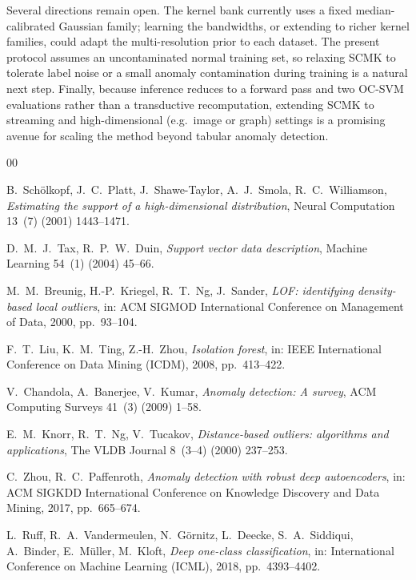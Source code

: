 \documentclass[times, review, 10pt]{elsarticle}
\begin{document}
Several directions remain open. The kernel bank currently uses a fixed
median-calibrated Gaussian family; learning the bandwidths, or extending to richer
kernel families, could adapt the multi-resolution prior to each dataset. The
present protocol assumes an uncontaminated normal training set, so relaxing SCMK to
tolerate label noise or a small anomaly contamination during training is a natural
next step. Finally, because inference reduces to a forward pass and two OC-SVM
evaluations rather than a transductive recomputation, extending SCMK to streaming
and high-dimensional (e.g.\ image or graph) settings is a promising avenue for
scaling the method beyond tabular anomaly detection.

\begin{thebibliography}{00}

B.~Sch\"olkopf, J.~C.~Platt, J.~Shawe-Taylor, A.~J.~Smola, R.~C.~Williamson,
\textit{Estimating the support of a high-dimensional distribution},
Neural Computation 13~(7) (2001) 1443--1471.

D.~M.~J.~Tax, R.~P.~W.~Duin,
\textit{Support vector data description},
Machine Learning 54~(1) (2004) 45--66.

M.~M.~Breunig, H.-P.~Kriegel, R.~T.~Ng, J.~Sander,
\textit{LOF: identifying density-based local outliers},
in: ACM SIGMOD International Conference on Management of Data, 2000,
pp.\ 93--104.

F.~T.~Liu, K.~M.~Ting, Z.-H.~Zhou,
\textit{Isolation forest},
in: IEEE International Conference on Data Mining (ICDM), 2008, pp.\ 413--422.

V.~Chandola, A.~Banerjee, V.~Kumar,
\textit{Anomaly detection: A survey},
ACM Computing Surveys 41~(3) (2009) 1--58.

E.~M.~Knorr, R.~T.~Ng, V.~Tucakov,
\textit{Distance-based outliers: algorithms and applications},
The VLDB Journal 8~(3--4) (2000) 237--253.

C.~Zhou, R.~C.~Paffenroth,
\textit{Anomaly detection with robust deep autoencoders},
in: ACM SIGKDD International Conference on Knowledge Discovery and Data Mining,
2017, pp.\ 665--674.

L.~Ruff, R.~A.~Vandermeulen, N.~G\"ornitz, L.~Deecke, S.~A.~Siddiqui,
A.~Binder, E.~M\"uller, M.~Kloft,
\textit{Deep one-class classification},
in: International Conference on Machine Learning (ICML), 2018, pp.\ 4393--4402.


\end{thebibliography}
\end{document}

